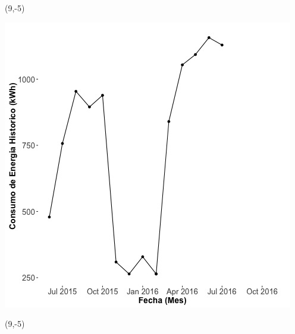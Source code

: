\documentclass{article}\usepackage[]{graphicx}\usepackage[]{color}
\newenvironment{knitrout}{}{} %
\begin{document}
 \begin{textblock}{1}(9,-5)
\begin{minipage}{20em}
\begingroup

\endgroup
\end{minipage}
\end{textblock}

\begin{knitrout}
\color{fgcolor}
\includegraphics[scale=0.65]{figure/A11_historico_energia} 
\end{knitrout}

 \begin{textblock}{1}(9,-5)
\begin{minipage}{20em}
\begingroup

\endgroup
\end{minipage}
\end{textblock}
\end{document}
